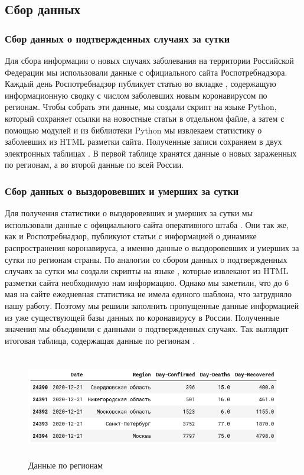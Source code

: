 \documentclass[a4paper, 12pt]{extarticle}
\begin{document}
\subsection{Сбор данных}
\subsubsection{Сбор данных о подтвержденных случаях за сутки}

Для сбора информации о новых случаях заболевания на территории Российской Федерации мы использовали данные с официального сайта Роспотребнадзора. Каждый день Роспотребнадзор публикует статью во вкладке , содержащую информационную сводку с числом заболевших новым коронавирусом по регионам. Чтобы собрать эти данные, мы создали скрипт на языке Python, который сохраняeт ссылки на новостные статьи в отдельном файле, а затем с помощью модулей  и  из библиотеки Python мы извлекаем статистику о заболевших из HTML разметки сайта. Полученные записи сохраняем в двух электронных таблицах . В первой таблице хранятся данные о новых зараженных по регионам, а во второй данные по всей России.

\subsubsection{Сбор данных о выздоровевших и умерших за сутки}
Для получения статистики о выздоровевших и умерших за сутки мы использовали данные с официального сайта оперативного штаба .  Они так же, как и Роспотребнадзор, публикуют статьи с информацией о динамике распространения коронавируса, а именно данные о выздоровевших и умерших за сутки по регионам страны. По аналогии со сбором данных о подтвержденных случаях за сутки мы создали скрипты на языке , которые извлекают из HTML разметки сайта необходимую нам информацию. Однако мы заметили, что до 6 мая на сайте  ежедневная статистика не имела единого шаблона, что затрудняло нашу работу. Поэтому мы решили заполнить пропущенные данные информацией из уже существующей базы данных по коронавирусу в России. Полученные значения мы объединили с данными о подтвержденных случаях. Так выглядит итоговая таблица, содержащая данные по регионам .

\begin{figure}[h]
    \centering
    \includegraphics[height=130pt]{../plots/regions_df2.png}
    \caption{Данные по регионам} \label{fig:collection2_res}
\end{figure}
\end{document}
